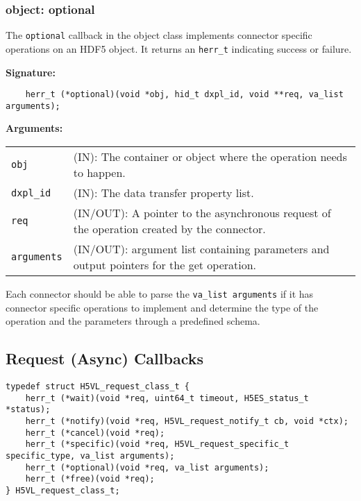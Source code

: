 \subsubsection{object: optional}
The \texttt{optional} callback in the object class implements connector specific operations on an HDF5 object. It returns an \texttt{herr\_t} indicating success or failure. \bigskip

\begin{mdframed}[style=bgbox]
\textbf{Signature:}
\begin{lstlisting}
    herr_t (*optional)(void *obj, hid_t dxpl_id, void **req, va_list arguments);
\end{lstlisting}

\textbf{Arguments:}\\
\begin{tabular}{l p{13.5cm}}
  \texttt{obj} & (IN): The container or object where the operation needs to happen.\\
  \texttt{dxpl\_id} & (IN): The data transfer property list.\\
  \texttt{req} & (IN/OUT): A pointer to the asynchronous request of the operation created by the connector.\\
  \texttt{arguments} & (IN/OUT): argument list containing parameters and output pointers for the get operation. \\
\end{tabular}
\end{mdframed}

Each connector should be able to parse the \texttt{va\_list arguments} if it has connector specific operations to implement and determine the type of the operation and the parameters through a predefined schema. 


\subsection{Request (Async) Callbacks}

\begin{lstlisting}[caption={Structure for async request callback routines, H5VLconnector.h}, captionpos=b, label={lst:Requestclass}]
typedef struct H5VL_request_class_t {                                            
    herr_t (*wait)(void *req, uint64_t timeout, H5ES_status_t *status);          
    herr_t (*notify)(void *req, H5VL_request_notify_t cb, void *ctx);            
    herr_t (*cancel)(void *req);                                                 
    herr_t (*specific)(void *req, H5VL_request_specific_t specific_type, va_list arguments);
    herr_t (*optional)(void *req, va_list arguments);                            
    herr_t (*free)(void *req);                                                   
} H5VL_request_class_t;
\end{lstlisting}

